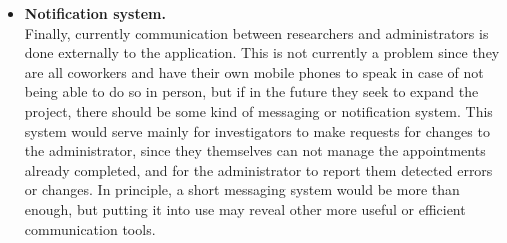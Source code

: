 \begin{itemize}
  \item\textbf{Notification system.} \\
  Finally, currently communication between researchers and administrators is done externally to the application. This is not currently a problem since they are all coworkers and have their own mobile phones to speak in case of not being able to do so in person, but if in the future they seek to expand the project, there should be some kind of messaging or notification system. This system would serve mainly for investigators to make requests for changes to the administrator, since they themselves can not manage the appointments already completed, and for the administrator to report them detected errors or changes. In principle, a short messaging system would be more than enough, but putting it into use may reveal other more useful or efficient communication tools. \\

\end{itemize}
    
    
    
    
    
    